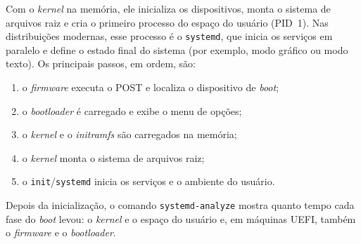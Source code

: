 Com o \textit{kernel} na memória, ele inicializa os dispositivos, monta o sistema de arquivos
raiz e cria o primeiro processo do espaço do usuário (PID~1). Nas distribuições modernas, esse
processo é o \texttt{systemd}, que inicia os serviços em paralelo e define o estado final do
sistema (por exemplo, modo gráfico ou modo texto). Os principais passos, em ordem, são:

\begin{enumerate}
    \item o \textit{firmware} executa o POST e localiza o dispositivo de \textit{boot};
    \item o \textit{bootloader} é carregado e exibe o menu de opções;
    \item o \textit{kernel} e o \textit{initramfs} são carregados na memória;
    \item o \textit{kernel} monta o sistema de arquivos raiz;
    \item o \texttt{init}/\texttt{systemd} inicia os serviços e o ambiente do usuário.
\end{enumerate}

Depois da inicialização, o comando \texttt{systemd-analyze} mostra quanto tempo cada fase do
\textit{boot} levou: o \textit{kernel} e o espaço do usuário e, em máquinas UEFI, também o
\textit{firmware} e o \textit{bootloader}.
